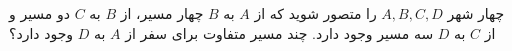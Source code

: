 \p
چهار شهر
$A, B, C, D$
را متصور شوید که از
$A$
به
$B$
چهار مسیر، از
$B$
به
$C$
دو مسیر و از
$C$
به
$D$
سه مسیر وجود دارد.
چند مسیر متفاوت برای سفر از
$A$
به
$D$
وجود دارد؟

